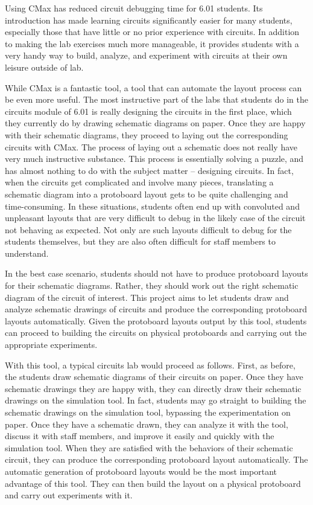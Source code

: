 Using CMax has reduced circuit debugging time for 6.01 students.
Its introduction has made
learning circuits significantly easier for many students, especially those that
have little or no prior experience with circuits. In addition to making the lab
exercises much more manageable, it provides students with a very handy way to
build, analyze, and experiment with circuits at their own leisure outside of lab.

While CMax is a fantastic tool, a tool that can automate the layout process
can be even more useful. The most instructive part of the labs that students do
in the circuits
module of 6.01 is really designing the circuits in the first place, which they
currently do by drawing schematic diagrams on paper. Once they are happy with
their schematic diagrams, they proceed to laying out the corresponding circuits
with CMax. The process of laying out a schematic does not really have very much
instructive substance. This process is essentially solving a puzzle, and has
almost nothing to do with the subject matter -- designing circuits. In fact,
when the circuits get complicated and involve many pieces, translating a
schematic diagram into a protoboard layout gets to be quite challenging and
time-consuming. In these situations, students often end up with convoluted and
unpleasant layouts that are very difficult to debug in the likely case of the
circuit not behaving as expected. Not only are such layouts difficult to debug
for the students themselves, but they are also often difficult for staff
members to understand.

In the best case scenario, students should not have to produce protoboard
layouts for their schematic diagrams. Rather, they should work out the right
schematic diagram of the circuit of interest. This project aims to let students
draw and
analyze schematic drawings of circuits and produce the corresponding protoboard
layouts automatically. Given the protoboard layouts output by this tool,
students can proceed to building the circuits on physical protoboards and
carrying out the appropriate experiments.

With this tool, a typical circuits lab would proceed as follows. First, as
before,
the students draw schematic diagrams of their circuits on paper. Once they have
schematic drawings they are happy with, they can directly draw their schematic
drawings on the simulation tool. In fact, students may go straight to building
the schematic drawings on the simulation tool, bypassing the experimentation on
paper. Once they have a schematic drawn, they can analyze it with the tool,
discuss it with staff members, and improve it easily and quickly with
the simulation tool. When they are
satisfied with the behaviors of their schematic circuit, they can produce the
corresponding protoboard layout automatically. The automatic generation of
protoboard layouts would be
the most important advantage of this tool. They can then build the layout on a
physical protoboard and carry out experiments with it.

